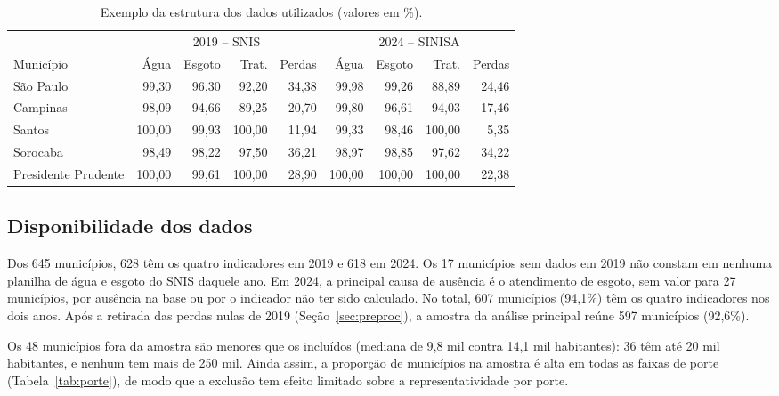 \documentclass[12pt]{article}
\begin{document}
\begin{table}[ht]
\centering
\caption{Exemplo da estrutura dos dados utilizados (valores em \%).}
\label{tab:exemplo}
\small
\setlength{\tabcolsep}{4pt}
\begin{tabular}{lrrrrrrrr}
\toprule
 & \multicolumn{4}{c}{2019 -- SNIS} & \multicolumn{4}{c}{2024 -- SINISA} \\
\cmidrule(lr){2-5}\cmidrule(lr){6-9}
Município & Água & Esgoto & Trat. & Perdas & Água & Esgoto & Trat. & Perdas \\
\midrule
São Paulo           &  99,30 & 96,30 &  92,20 & 34,38 &  99,98 &  99,26 &  88,89 & 24,46 \\
Campinas            &  98,09 & 94,66 &  89,25 & 20,70 &  99,80 &  96,61 &  94,03 & 17,46 \\
Santos              & 100,00 & 99,93 & 100,00 & 11,94 &  99,33 &  98,46 & 100,00 &  5,35 \\
Sorocaba            &  98,49 & 98,22 &  97,50 & 36,21 &  98,97 &  98,85 &  97,62 & 34,22 \\
Presidente Prudente & 100,00 & 99,61 & 100,00 & 28,90 & 100,00 & 100,00 & 100,00 & 22,38 \\
\bottomrule
\end{tabular}
\end{table}

\subsection{Disponibilidade dos dados}

Dos 645 municípios, 628 têm os quatro indicadores em 2019 e 618 em 2024. Os 17 municípios sem dados
em 2019 não constam em nenhuma planilha de água e esgoto do SNIS daquele ano. Em 2024, a principal
causa de ausência é o atendimento de esgoto, sem valor para 27 municípios, por ausência na base ou
por o indicador não ter sido calculado. No total, 607 municípios (94,1\%) têm os quatro indicadores
nos dois anos. Após a retirada das perdas nulas de 2019 (Seção~\ref{sec:preproc}), a amostra da análise principal
reúne 597 municípios (92,6\%).

Os 48 municípios fora da amostra são menores que os incluídos (mediana de 9,8 mil contra 14,1 mil
habitantes): 36 têm até 20 mil habitantes, e nenhum tem mais de 250 mil. Ainda assim, a proporção de
municípios na amostra é alta em todas as faixas de porte (Tabela~\ref{tab:porte}), de modo que a
exclusão tem efeito limitado sobre a representatividade por porte.
\end{document}

